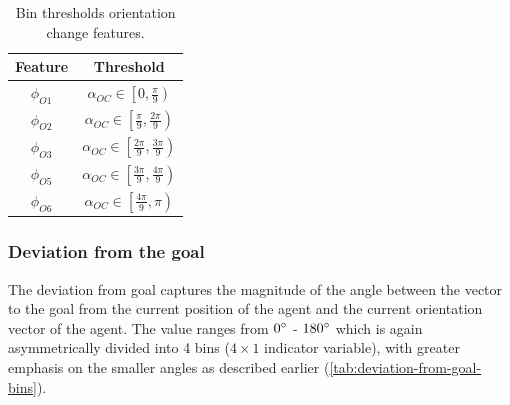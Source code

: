 \begin{table}[!htbp]

    \begin{center}
        \renewcommand{\arraystretch}{1.3}
        \begin{tabular}{|c|c|}
            \hline
            \textbf{Feature} & \textbf{Threshold} \\
            \hline
            $\phi_{O1}$ & $\alpha_{OC} \in \left[ 0 , \frac{\pi}{9} \right)$ \\
            
            $\phi_{O2}$ & $\alpha_{OC} \in \left[ \frac{\pi}{9} , \frac{2\pi}{9} \right)$ \\
            
            $\phi_{O3}$ & $\alpha_{OC} \in \left[ \frac{2\pi}{9} , \frac{3\pi}{9} \right)$ \\
    
            
            $\phi_{O5}$ & $\alpha_{OC} \in \left[ \frac{3\pi}{9} , \frac{4\pi}{9} \right)$ \\
            
            $\phi_{O6}$ & $\alpha_{OC} \in \left[ \frac{4\pi}{9} , \pi \right)$ \\
            \hline
        \end{tabular}
        \caption{Bin thresholds orientation change features.}
    \label{tab:orientation-change-bins}
    \end{center}
\end{table}
\subsubsection*{Deviation from the goal}
The deviation from goal captures the magnitude of the angle between the vector to the goal from the current position of the agent and the current orientation vector of the agent. The value ranges from $0 \degree$ - $ 180 \degree$ which is again asymmetrically divided into 4 bins ($4 \times 1$ indicator variable), with greater emphasis on the smaller angles as described earlier (\autoref{tab:deviation-from-goal-bins}). 

